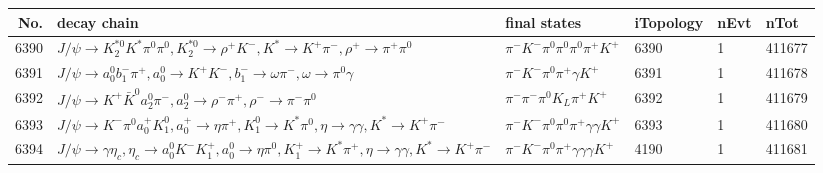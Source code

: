 \begin{table}[htbp] 
\begin{center}
\begin{small}
\begin{tabular}{rlllll}\hline\hline
 No. & decay chain & final states &  iTopology & nEvt & nTot \\\hline
6390&$J/\psi       \rightarrow K_2^{*0}       K^{*}          \pi^{0}        \pi^{0}        , K_2^{*0}        \rightarrow \rho^{+}      K^{-}          , K^{*}           \rightarrow K^{+}          \pi^{-}        , \rho^{+}       \rightarrow \pi^{+}        \pi^{0}        $&$\pi^{-}        K^{-}          \pi^{0}        \pi^{0}        \pi^{0}        \pi^{+}        K^{+}          $& 6390&    1&411677\\
6391&$J/\psi       \rightarrow a_{0}^{0}      b_{1}^{-}      \pi^{+}        , a_{0}^{0}       \rightarrow K^{+}          K^{-}          , b_{1}^{-}       \rightarrow \omega         \pi^{-}        , \omega          \rightarrow \pi^{0}        \gamma       $&$\pi^{-}        K^{-}          \pi^{0}        \pi^{+}        \gamma       K^{+}          $& 6391&    1&411678\\
6392&$J/\psi       \rightarrow K^{+}          \bar{K}^{0}   a_{2}^{0}      \pi^{-}        , a_{2}^{0}       \rightarrow \rho^{-}      \pi^{+}        , \rho^{-}       \rightarrow \pi^{-}        \pi^{0}        $&$\pi^{-}        \pi^{-}        \pi^{0}        K_{L}          \pi^{+}        K^{+}          $& 6392&    1&411679\\
6393&$J/\psi       \rightarrow K^{-}          \pi^{0}        a_{0}^{+}      K_1^{0}        , a_{0}^{+}       \rightarrow \eta          \pi^{+}        , K_1^{0}         \rightarrow K^{*}          \pi^{0}        , \eta           \rightarrow \gamma       \gamma       , K^{*}           \rightarrow K^{+}          \pi^{-}        $&$\pi^{-}        K^{-}          \pi^{0}        \pi^{0}        \pi^{+}        \gamma       \gamma       K^{+}          $& 6393&    1&411680\\
6394&$J/\psi       \rightarrow \gamma       \eta_{c}    , \eta_{c}     \rightarrow a_{0}^{0}      K^{-}          K_1^{+}        , a_{0}^{0}       \rightarrow \eta          \pi^{0}        , K_1^{+}         \rightarrow K^{*}          \pi^{+}        , \eta           \rightarrow \gamma       \gamma       , K^{*}           \rightarrow K^{+}          \pi^{-}        $&$\pi^{-}        K^{-}          \pi^{0}        \pi^{+}        \gamma       \gamma       \gamma       K^{+}          $& 4190&    1&411681\\

\end{tabular}
\end{small}
\end{center}
\end{table}
